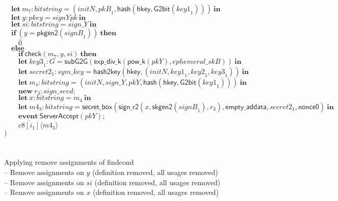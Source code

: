 \documentclass{article}
\newcommand{\coutput}[2]{\overline{#1}\langle{#2}\rangle}
\newcommand{\kw}[1]{\mathbf{#1}}
\newcommand{\kwf}[1]{\mathsf{#1}}
\newcommand{\var}[1]{\mathit{#1}}
\newcommand{\kwt}[1]{\mathit{#1}}
\newcommand{\kwc}[1]{\mathit{#1}}
\begin{document}
\begin{tabbing}
\>$\quad \kw{let}\ \var{m}_{7}: \kwt{bitstring} = \kwf{}(\var{initN}, \var{pkB}_{1}, \kwf{hash}(\kwf{hkey}, \kwf{G2bit}(\var{key1}_{1})))\ \kw{in}$\\
\>$\quad \kw{let}\ \var{y}: \kwt{pkey} = \var{signYpk}\ \kw{in}$\\
\>$\quad \kw{let}\ \var{si}: \kwt{bitstring} = \var{sign{\_}Y}\ \kw{in}$\\
\>$\quad \kw{if}\ (\var{y}  =  \kwf{pkgen2}(\var{signB}_{1}))\ \kw{then}$\\
\>$\quad \quad \overline{0}$\\
\>$\quad \kw{else}$\\
\>$\quad \quad \kw{if}\ \kwf{check}(\var{m}_{7}, \var{y}, \var{si})\ \kw{then}$\\
\>$\quad \quad \kw{let}\ \var{key3}_{1}: \kwt{G} = \kwf{subG2G}(\kwf{exp{\_}div{\_}k}(\kwf{pow{\_}k}(\var{pkY}), \var{ephemeral{\_}skB}))\ \kw{in}$\\
\>$\quad \quad \kw{let}\ \var{secret2}_{1}: \kwt{sym{\_}key} = \kwf{hash2key}(\kwf{hkey}, \kwf{}(\var{initN}, \var{key1}_{1}, \var{key2}_{1}, \var{key3}_{1}))\ \kw{in}$\\
\>$\quad \quad \kw{let}\ \var{m}_{4}: \kwt{bitstring} = \kwf{}(\var{initN}, \var{sign{\_}Y}, \var{pkY}, \kwf{hash}(\kwf{hkey}, \kwf{G2bit}(\var{key1}_{1})))\ \kw{in}$\\
\>$\quad \quad \kw{new}\ \var{r}_{3}: \kwt{sign{\_}seed};$\\
\>$\quad \quad \kw{let}\ \var{x}: \kwt{bitstring} = \var{m}_{4}\ \kw{in}$\\
\>$\quad \quad \kw{let}\ \var{m4}_{3}: \kwt{bitstring} = \kwf{secret{\_}box}(\kwf{sign{\_}r2}(\var{x}, \kwf{skgen2}(\var{signB}_{1}), \var{r}_{3}), \kwf{empty{\_}addata}, \var{secret2}_{1}, \kwf{nonce0})\ \kw{in}$\\
\>$\quad \quad \kw{event}\ \kwf{ServerAccept}(\var{pkY});$\\
\>$\quad \quad \coutput{\kwc{c8}[\var{i}_{1}]}{\var{m4}_{3}}$\\
\>$)$\\
\\
\\
Applying remove assignments of findcond\\
\quad -- Remove assignments on $\var{y}$ (definition removed, all usages removed)\\
\quad -- Remove assignments on $\var{si}$ (definition removed, all usages removed)\\
\quad -- Remove assignments on $\var{x}$ (definition removed, all usages removed)\\

\end{tabbing}
\end{document}
